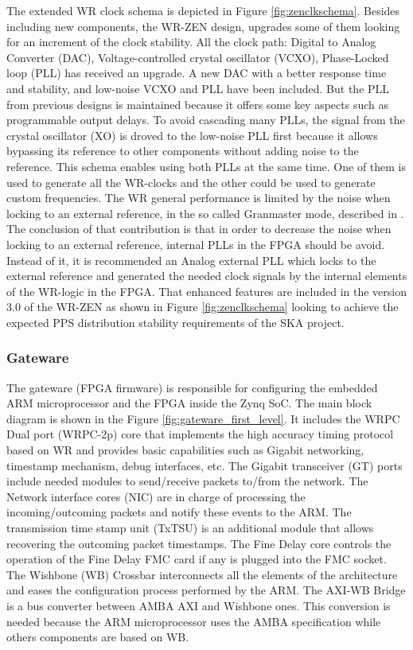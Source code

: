 The extended WR clock schema is depicted in Figure \ref{fig:zenclkschema}. 
Besides including new components, the WR-ZEN design, upgrades some of them 
looking for an increment of the clock stability. All the clock path: Digital to Analog
Converter (DAC), Voltage-controlled crystal oscillator (VCXO), 
Phase-Locked loop (PLL) has received an upgrade. A new DAC with a better response time and 
stability, and low-noise VCXO and PLL have been included. But the PLL from 
previous designs is maintained because it offers some key aspects such as 
programmable output delays. To avoid cascading many PLLs, the signal from the 
crystal oscillator (XO) is droved to the low-noise PLL first because it allows bypassing its 
reference to other components without adding noise to the reference. This 
schema enables using both PLLs at the same time. One of them is used to 
generate all the WR-clocks and the other could be used to generate custom 
frequencies. The WR general 
performance is limited by the noise when locking to an external reference, in 
the so called Granmaster mode, described in \cite{Rizzi2016}. The conclusion of 
that contribution is that in order to decrease the noise when locking to an 
external reference, internal PLLs in the FPGA should be avoid. Instead of it, 
it is recommended an Analog external PLL which locks to the external reference 
and generated the needed clock signals by the internal elements of the WR-logic 
in the FPGA. That enhanced features are included in the version 3.0 of the WR-ZEN as 
shown in Figure \ref{fig:zenclkschema} looking to achieve the expected PPS 
distribution stability requirements of the SKA project.


\subsubsection{Gateware}
\label{subsec:gateware}

The gateware (FPGA firmware) is responsible for configuring the embedded ARM microprocessor and the FPGA inside the Zynq SoC. The main block diagram is shown in the Figure \ref{fig:gateware_first_level}. It includes the WRPC Dual port (WRPC-2p) core that implements the high accuracy timing protocol based on WR and provides basic capabilities such as Gigabit networking, timestamp mechanism, debug interfaces, etc. The Gigabit transceiver (GT) ports include needed modules to send/receive packets to/from the network. The Network interface cores (NIC) are in charge of processing the incoming/outcoming packets and notify these events to the ARM. The transmission time stamp unit (TxTSU) is an additional module that allows recovering the outcoming packet timestamps. The Fine Delay core controls the operation of the Fine Delay FMC card if any is plugged into the FMC socket. The Wishbone (WB) Crossbar interconnects all the elements of the architecture and eases the configuration process performed by the ARM. The AXI-WB Bridge is a bus converter between AMBA AXI and Wishbone ones. This conversion is needed because the ARM microprocessor uses the AMBA specification while others components are based on WB.

